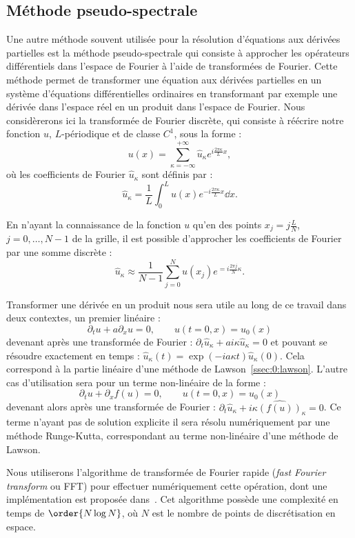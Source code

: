\subsection{Méthode pseudo-spectrale}

Une autre méthode souvent utilisée pour la résolution d'équations aux dérivées partielles est la méthode pseudo-spectrale qui consiste à approcher les opérateurs différentiels dans l'espace de Fourier à l'aide de transformées de Fourier. Cette méthode permet de transformer une équation aux dérivées partielles en un système d'équations différentielles ordinaires en transformant par exemple une dérivée dans l'espace réel en un produit dans l'espace de Fourier. Nous considèrerons ici la transformée de Fourier discrète, qui consiste à réécrire notre fonction $u$, $L$-périodique et de classe $C^1$, sous la forme :
$$
  u(x) = \sum_{\kappa=-\infty}^{+\infty} \hat{u}_\kappa e^{i\frac{2\pi \kappa}{L}x},
$$
où les coefficients de Fourier $\hat{u}_\kappa$ sont définis par :
$$
  \hat{u}_\kappa = \frac{1}{L}\int_0^L u(x)e^{-i\frac{2\pi \kappa}{L}x}\dd{x}.
$$

En n'ayant la connaissance de la fonction $u$ qu'en des points $x_j = j\frac{L}{N}$, $j=0,\dots,N-1$ de la grille, il est possible d'approcher les coefficients de Fourier par une somme discrète :
$$
  \hat{u}_\kappa \approx \frac{1}{N-1}\sum_{j=0}^N u(x_j) e^{=i\frac{2\pi j}{N}\kappa}.
$$

Transformer une dérivée en un produit nous sera utile au long de ce travail dans deux contextes, un premier linéaire :
$$
  \partial_t u + a\partial_x u = 0,\qquad u(t=0,x)=u_0(x)
$$
devenant après une transformée de Fourier : $\partial_t \hat{u}_\kappa + ai\kappa \hat{u}_\kappa = 0$ et pouvant se résoudre exactement en temps : $\hat{u}_\kappa(t) = \exp(-ia\kappa t)\hat{u}_\kappa(0)$. Cela correspond à la partie linéaire d'une méthode de Lawson~\ref{ssec:0:lawson}. L'autre cas d'utilisation sera pour un terme non-linéaire de la forme :
$$
  \partial_t u + \partial_xf(u) = 0,\qquad u(t=0,x)=u_0(x)
$$
devenant alors après une transformée de Fourier : $\partial_t\hat{u}_\kappa + i\kappa\widehat{\left(f(u)\right)}_\kappa = 0$. Ce terme n'ayant pas de solution explicite il sera résolu numériquement par une méthode Runge-Kutta, correspondant au terme non-linéaire d'une méthode de Lawson.

Nous utiliserons l'algorithme de transformée de Fourier rapide (\emph{fast Fourier transform} ou FFT) pour effectuer numériquement cette opération, dont une implémentation est proposée dans~\cite{Saramito:2013}. Cet algorithme possède une complexité en temps de $\order{N\log N}$, où $N$ est le nombre de points de discrétisation en espace.
